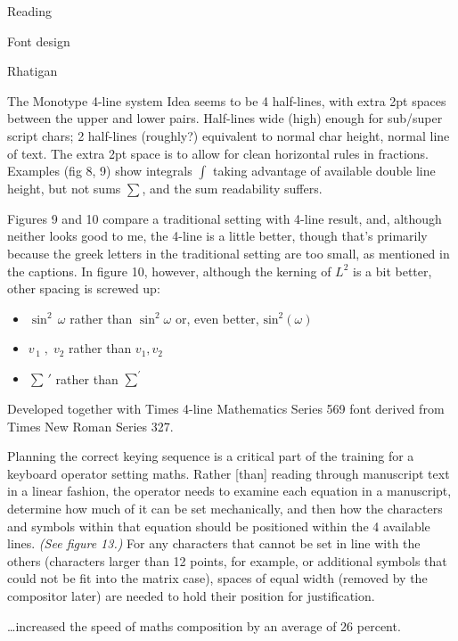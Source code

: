 \documentclass[12pt]{PalisadesLakesBook}
\begin{document}
\begin{plSection}{Reading}
\begin{plSection}{Font design}
\begin{plSection}{Rhatigan}
\begin{plSection}{The Monotype 4-line system}
Idea seems to be 4 half-lines, with extra 2pt spaces between the 
upper and lower pairs.
Half-lines wide (high) enough for sub/super script chars;
2 half-lines (roughly?) equivalent to normal char height, 
normal line of text.
The extra 2pt space is to allow for clean horizontal rules in
fractions.
Examples (fig 8, 9) show integrals $\int$ 
taking advantage of 
available double line height, but not sums $\sum$,
and the sum readability suffers.

Figures 9 and 10 compare a traditional setting with 4-line result,
and, although neither looks good to me,
the 4-line is a little better,
though that's primarily because the greek letters 
in the traditional setting are too small,
as mentioned in the captions.
In figure 10, however, although the kerning of 
$L^2$ is a bit better, other spacing is screwed up:
\begin{itemize}
\item $\sin^2 \,\omega$ rather than $\sin^{2}\!\omega$ or, even better, 
 $\textrm{sin}^{2}\!\left(\omega\right)$
\item $v_{\,1}\;,\;v_{2}$ rather than $v_{1},v_{2}$
\item $\sum\,'$ rather than $\sum^{'}$
\end{itemize}

Developed together with Times 4-line Mathematics Series 569 font
derived from Times New Roman Series 327. 

\begin{plQuote}{}
{}
Planning the correct keying sequence is a critical part of the
training for a keyboard operator setting maths.
Rather [than] reading through manuscript text 
in a linear fashion,
the operator needs to examine each equation in a manuscript,
determine how much of it can be set mechanically,
and then how the characters and symbols within that equation
should be positioned within the 4 available lines. 
\textit{(See figure 13.)}
For any characters that cannot be set in line with the others
(characters larger than 12 points, for example,
or additional symbols that could not be fit into the matrix case),
spaces of equal width (removed by the compositor later)
are needed to hold their position for justification.
\end{plQuote}

\begin{plQuote}{}
{}
\ldots increased the speed of maths composition 
by an average of 26 percent.
\end{plQuote}


\end{plSection}
\end{plSection}
\end{plSection}
\end{plSection}
\end{document}
